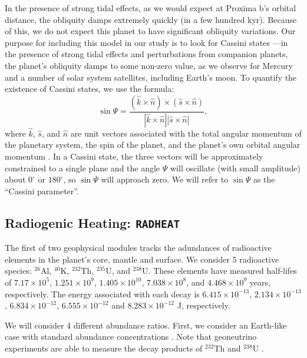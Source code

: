 \documentclass[preprint,12pt]{aastex}
\def\eg{{\it e.g.\ }}
\def\radheat{\texttt{\footnotesize{RADHEAT}}\xspace}
\begin{document}
In the presence of strong tidal effects, as we would expect at Proxima b's orbital 
distance, the obliquity damps extremely quickly (in a few hundred kyr). Because 
of this, we do not expect this planet to have significant obliquity variations. Our 
purpose for including this model in our study is to look for Cassini states 
\citep{Colombo1966}---in the presence of strong tidal effects and perturbations
from companion planets, the planet's obliquity damps to some non-zero value, 
as we observe for Mercury and a number of solar system satellites, including 
Earth's moon. To quantify the existence of Cassini states, we use the formula:
\begin{equation}
\sin{\Psi} = \frac{(\hat{k}\times \hat{n}) \times (\hat{s} \times \hat{n})}{ | \hat{k}
\times \hat{n}  | \left | \hat{s} \times \hat{n} \right |},
\label{eqn:cassini}
\end{equation}
where $\hat{k}$, $\hat{s}$, and $\hat{n}$ are unit vectors associated with 
the total angular momentum of the planetary system, the spin of the planet,
and the planet's own orbital angular momentum \citep[see][]{Hamilton2004}.
In a Cassini state, the three vectors will be approximately constrained to a
single plane and the angle $\Psi$ will oscillate (with small amplitude) 
about $0^{\circ}$ or $180^{\circ}$, so $\sin{\Psi}$ will approach zero. 
We will refer to $\sin{\Psi}$ as the ``Cassini parameter''.

\subsection{Radiogenic Heating: \radheat}
\label{sec:models:radheat}

The first of two geophysical modules tracks the adundances of
radioactive elements in the planet's core, mantle and surface. We
consider 5 radioactive species: $^{26}$Al, $^{40}$K, $^{232}$Th,
$^{235}$U, and $^{238}$U. These elements have measured half-lifes of
$7.17 \times 10^5$, $1.251 \times 10^9$, $1.405 \times 10^{10}$,
$7.038 \times 10^8$, and $4.468 \times 10^9$ years, respectively. The
energy associated with each decay is $6.415 \times 10^{-13}$,
$2.134 \times 10^{-13}$, $6.834 \times 10^{-12}$,
$6.555 \times 10^{-12}$ and $8.283 \times 10^{-12}$ J, respectively.

We will consider 4 different abundance ratios. First, we consider an
Earth-like case with standard abundance concentrations
\citep[\eg][]{Korenaga03,Arevalo09,Huang13}. Note that geoneutrino
experiments are able to measure the decay products of $^{232}$Th and
$^{238}$U \citep{Raghavan98,Araki05,Dye10}.
\end{document}
